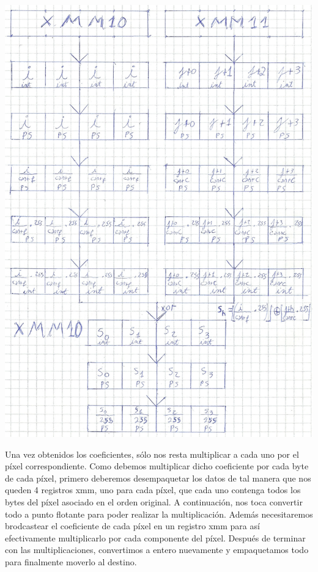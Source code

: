 \documentclass[a4paper]{article}
\begin{document}
\begin{center}
\includegraphics[scale=0.75]{Dibujos/S1.jpg}
\end{center}

Una vez obtenidos los coeficientes, sólo nos resta multiplicar a cada uno por el píxel correspondiente. Como debemos multiplicar dicho coeficiente por cada byte de cada píxel, primero deberemos desempaquetar los datos de tal manera que nos queden 4 registros xmm, uno para cada píxel, que cada uno contenga todos los bytes del píxel asociado en el orden original. A continuación, nos toca convertir todo a punto flotante para poder realizar la multiplicación. Además necesitaremos brodcastear el coeficiente de cada píxel en un registro xmm para así efectivamente multiplicarlo por cada componente del píxel. Después de terminar con las multiplicaciones, convertimos a entero nuevamente y empaquetamos todo para finalmente moverlo al destino.
\end{document}
